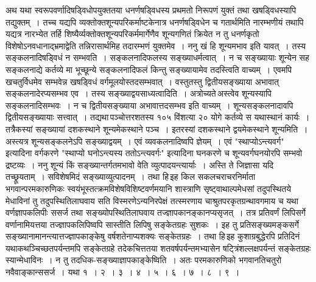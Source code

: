 \documentclass[11pt, openany]{book}
\begin{document}
\begin{sloppypar}
अथ यथा स्वरूपवर्णादिषड्विधोपयुक्ततया धनर्णषड्विधस्य प्रथमतो निरूपणं युक्तं तथा खषड्विधस्यापि तद्युक्तम्~। तच्च यद्यपि व्यक्तोक्तशून्यपरिकर्माष्टकेनात्र धनर्णषड्विधेन च गतार्थमिति नारम्भणीयं तथापि यद्यत्र नारभ्येत तर्हि शिष्यैर्व्यक्तोक्तशून्यपरिकर्ममार्गेणैव शून्यगणितं क्रियेत न तु धनर्णकृतो विशेषोऽनवधानाद्भ्रमाद्वेति तन्निरासार्थमिह तदारम्भणं युक्तमेव~। ननु खं हि शून्यमभाव इति यावत्~। तस्य सङ्कलनादिषड्विधं न सम्भवति~। सङ्कलनादिफलस्य सङ्ख्याधर्मत्वात्~। न च सङ्ख्यायाः शून्येन सह सङ्कलनाद्ये कर्तव्ये मा भूच्छून्ये सङ्कलनादिफलं किन्तु सङ्ख्यायामेव तदस्त्विति वाच्यम्~। एवमपि खचतुर्विधमेव सम्भवेन्न खषड्विधं वर्गमूलयोस्तदसम्भवात्~। वस्तुतस्तु द्वितीयसङ्ख्याया अभावात् सङ्कलनादेरप्यसम्भव एव~। तस्य सङ्ख्याद्वयसाध्यत्वादिति~। अत्रोच्यते\textendash \,अस्त्वेव शून्यस्यापि सङ्कलनादिसम्भवः~। न च द्वितीयसङ्ख्याया अभावात्तदसम्भव इति वाच्यम्~। शून्यसङ्कलनादावपि द्वितीयसङ्ख्यायाः सत्त्वात्~। तद्यथा\textendash \,पञ्चोत्तरशतस्य १०५ विंशत्या २० योगे कर्तव्ये स यथास्थानं कार्यः~। तत्रैकस्यां सङ्ख्यायां दशकस्थाने शून्यमेकस्थाने पञ्च~। इतरस्यां दशकस्थाने द्वयमेकस्थाने  शून्यमिति~। अस्त्यत्र शून्यसङ्कलनेऽपि सङ्ख्याद्वयम्~। एवं व्यवकलनादिष्वपि ज्ञेयम्~। एवं {\color{violet}"स्थाप्योऽन्त्यवर्ग"} इत्यादिना वर्गकरणे {\color{violet}"स्थाप्यो घनोऽन्त्यस्य ततोऽन्त्यवर्गः"} इत्यादिना घनकरणे च शून्यवर्गघनयोरपि सम्भवो द्रष्टव्यः~। ननु शून्यं किं सङ्ख्यान्तर्गतमभावो वेति व्युत्पादयन्त्यार्याः~। अस्ति ते जिज्ञासा यदि तच्छ्रूयताम्~। सविशेषमिदं सङ्ख्याव्युत्पादनम्~। तथा हि\textendash \,इह किल सकलचराचरनिर्माता भगवान्परमकारुणिकः स्वयंभूस्तत्क्रमविशेषविशिष्टवर्णमयानि शास्त्राणि सृष्ट्वाथाल्पमेधसां तदुपस्थितये मेधाविनां तु तदुपस्थितिलाघवाय सति विस्मरणेऽन्यनिरपेक्षं तत्स्मरणाय चाश्रुतपरकृतग्रन्थावगमाय च यथा वर्णज्ञापकलिपीः ससर्ज तथा सङ्ख्योपस्थितिलाघवाय तज्ज्ञापकानङ्कानप्यसृजत्~। तत्र प्रतिवर्णं लिपिसर्गे वर्णानामियत्तया तज्ज्ञापकलिपिष्वपि सास्तीति लिपिषु सङ्केतग्रहः सुशकः~। इह तु प्रतिसङ्ख्यमङ्कसर्गे सङ्ख्यानामानन्त्यात्तज्ज्ञापकाङ्केषु वर्षशतेनाप्यशक्यः सङ्केतग्रहः~। तथा हि\textendash \,इह कुशाग्रबुद्धेरपि प्रतिदिनं यथाकथञ्चिच्छतपर्यन्तमपि सङ्केतग्रहे तदेकचित्ततया शतवर्षपर्यन्तमभ्यासेन षट्त्रिंशल्लक्षपर्यन्तं सङ्केतग्रहः स्यान्मेधाविनः~। न तु तदधिक-सङ्ख्याज्ञापकाङ्केष्विति~। अतः परमकारुणिको भगवानतिचतुरो नवैवाङ्कान्ससर्ज~। यथा १~। २~। ३~। ४~। ५~। ६~। ७~। ८~। ९~। 
\end{sloppypar}

\newpage
\end{document}

